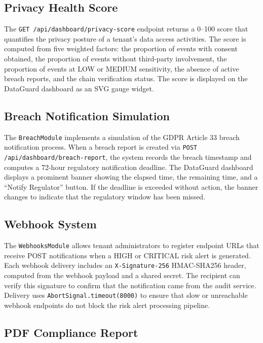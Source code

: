 \documentclass[a4paper,12pt,onecolumn]{report}
\begin{document}
\subsection{Privacy Health Score}

The \texttt{GET /api/dashboard/privacy-score} endpoint returns a 0--100 score that quantifies the privacy posture of a tenant's data access activities.
The score is computed from five weighted factors: the proportion of events with consent obtained, the proportion of events without third-party involvement, the proportion of events at LOW or MEDIUM sensitivity, the absence of active breach reports, and the chain verification status.
The score is displayed on the DataGuard dashboard as an SVG gauge widget.

\subsection{Breach Notification Simulation}

The \texttt{BreachModule} implements a simulation of the GDPR Article 33 breach notification process.
When a breach report is created via \texttt{POST /api/dashboard/breach-report}, the system records the breach timestamp and computes a 72-hour regulatory notification deadline.
The DataGuard dashboard displays a prominent banner showing the elapsed time, the remaining time, and a ``Notify Regulator'' button.
If the deadline is exceeded without action, the banner changes to indicate that the regulatory window has been missed.

\subsection{Webhook System}

The \texttt{WebhooksModule} allows tenant administrators to register endpoint URLs that receive POST notifications when a HIGH or CRITICAL risk alert is generated.
Each webhook delivery includes an \texttt{X-Signature-256} HMAC-SHA256 header, computed from the webhook payload and a shared secret.
The recipient can verify this signature to confirm that the notification came from the audit service.
Delivery uses \texttt{AbortSignal.timeout(8000)} to ensure that slow or unreachable webhook endpoints do not block the risk alert processing pipeline.

\subsection{PDF Compliance Report}
\end{document}

